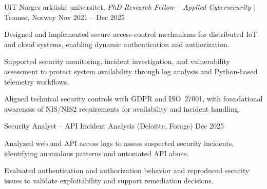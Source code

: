 



\begin{cventries2}

  \cventry
    {UiT Norges arktiske universitet, \textnormal{\textit{PhD Research Fellow – Applied Cybersecurity} | Tromsø, Norway}}
    {Nov 2021 -- Dec 2025}
    {
      \begin{cvitems}
        \item {Designed and implemented secure access-control mechanisms for distributed IoT and cloud systems, enabling dynamic authentication and authorization.}
        \item {Supported security monitoring, incident investigation, and vulnerability assessment to protect system availability through log analysis and Python-based telemetry workflows.}
        \item {Aligned technical security controls with GDPR and ISO~27001, with foundational awareness of NIS/NIS2 requirements for availability and incident handling.}
      \end{cvitems}
    }
    \vspace{3mm}

  \cventry
    {Security Analyst – API Incident Analysis (Deloitte, Forage)}
    {Dec 2025}
    {
      \begin{cvitems}
        \item {Analyzed web and API access logs to assess suspected security incidents, identifying anomalous patterns and automated API abuse.}
        \item {Evaluated authentication and authorization behavior and reproduced security issues to validate exploitability and support remediation decisions.}
      \end{cvitems}
    }
    \vspace{3mm}


\end{cventries2}
